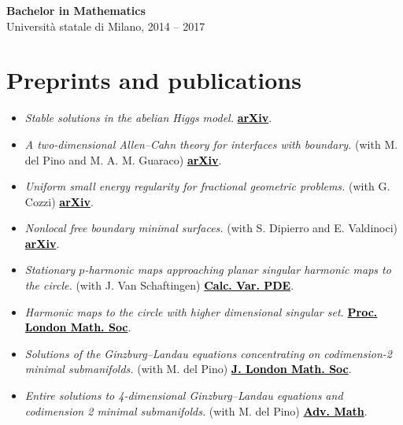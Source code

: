 \documentclass[a4paper,11pt]{article}
\newcommand{\changed}[1]{#1}
\newcommand{\blackhref}[2]{\href{#1}{\textcolor{black}{#2}}}
\begin{document}
\textbf{Bachelor in Mathematics} \\
Università statale di Milano, 2014 -- 2017

\vspace{5mm}

\section*{Preprints and publications}
\noindent
\begin{itemize}
    \item \changed{\emph{Stable solutions in the abelian Higgs model.} \blackhref{https://arxiv.org/abs/2609.11647}{\textbf{arXiv}}.}
    \item \changed{\emph{A two-dimensional Allen--Cahn theory for interfaces with boundary.} (with M. del Pino and M. A. M. Guaraco) \blackhref{https://arxiv.org/abs/2607.29588}{\textbf{arXiv}}.}
    \item \changed{\emph{Uniform small energy regularity for fractional geometric problems.} (with G. Cozzi) \blackhref{https://arxiv.org/abs/2605.06128}{\textbf{arXiv}}.}
    \item \emph{Nonlocal free boundary minimal surfaces.} (with S. Dipierro and E. Valdinoci) \blackhref{https://arxiv.org/abs/2508.00337}{\textbf{arXiv}}.
    \item \emph{Stationary $p$-harmonic maps approaching planar singular harmonic maps to the circle.} (with J. Van Schaftingen) \blackhref{https://link.springer.com/article/10.1007/s00526-025-03160-w}{\textbf{Calc. Var. PDE}}.
    \item \changed{\emph{Harmonic maps to the circle with higher dimensional singular set.} \blackhref{https://londmathsoc.onlinelibrary.wiley.com/doi/10.1112/plms.70135}{\textbf{Proc. London Math. Soc}}.}
    \item \emph{Solutions of the Ginzburg--Landau equations concentrating on codimension-2 minimal submanifolds.} (with M. del Pino) \blackhref{https://londmathsoc.onlinelibrary.wiley.com/doi/10.1112/jlms.12851}{\textbf{J. London Math. Soc}}.
    \item \emph{Entire solutions to 4-dimensional Ginzburg--Landau equations and codimension 2 minimal submanifolds.} (with M. del Pino) \blackhref{https://www.sciencedirect.com/science/article/pii/S000187082300508X}{\textbf{Adv. Math}}.
\end{itemize}

\vspace{5mm}
\end{document}
